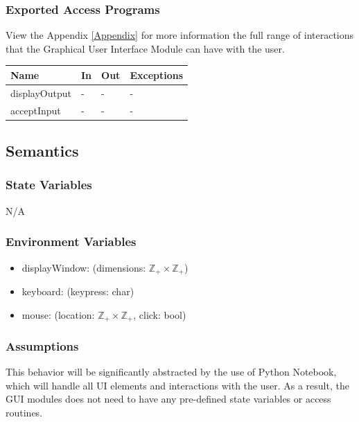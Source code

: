 \documentclass[12pt, titlepage]{article}
\begin{document}
\subsubsection{Exported Access Programs}


View the Appendix \ref{Appendix} for more information the full range of
interactions that the Graphical User Interface Module can have with the user.

\begin{center}
\begin{tabular}{p{4cm} p{4cm} p{4cm} p{2cm}}
\hline
\textbf{Name} & \textbf{In} & \textbf{Out} & \textbf{Exceptions} \\
\hline
displayOutput & - & - & - \\
acceptInput & - & - & - \\
\hline
\end{tabular}
\end{center}

\subsection{Semantics}

\subsubsection{State Variables}

N/A

\subsubsection{Environment Variables}

\begin{itemize}
  \item displayWindow: (dimensions: $\mathbb{Z}_+ \times \mathbb{Z}_+$)
  \item keyboard: (keypress: char)
  \item mouse: (location: $\mathbb{Z}_+ \times \mathbb{Z}_+$, click: bool)
\end{itemize}

\subsubsection{Assumptions}

This behavior will be significantly abstracted by the use of Python Notebook,
which will handle all UI elements and interactions with the user. As a result,
the GUI modules does not need to have any pre-defined state variables or access
routines.
\end{document}
